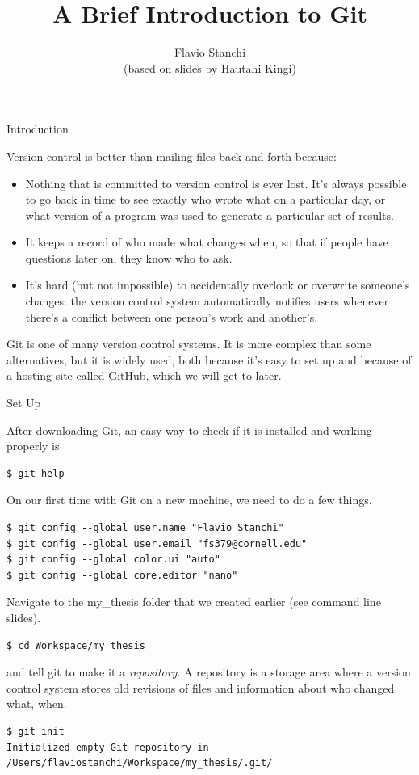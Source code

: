 \documentclass[10pt]{beamer}
\begin{document}
\title{A Brief Introduction to Git}
\author{Flavio Stanchi \\ (based on slides by Hautahi Kingi)}
\date{}


\maketitle

\begin{frame}{Introduction}


Version control is better than mailing files back and forth because:
\begin{itemize}
\item
Nothing that is committed to version control is ever lost. It's always possible to go back in time to see exactly who wrote what on a particular day, or what version of a program was used to generate a particular set of results.
\item
It keeps a record of who made what changes when, so that if people have questions later on, they know who to ask.
\item
It's hard (but not impossible) to accidentally overlook or overwrite someone's changes: the version control system automatically notifies users whenever there's a conflict between one person's work and another's.
\end{itemize}
Git is one of many version control systems. It is more complex than some alternatives, but it is widely used, both because it's easy to set up and because of a hosting site called GitHub, which we will get to later.

\end{frame}

\begin{frame}[fragile]{Set Up}

After downloading Git, an easy way to check if it is installed and working properly is
\begin{lstlisting}
$ git help
\end{lstlisting}
On our first time with Git on a new machine, we need to do a few things.
\begin{lstlisting}
$ git config --global user.name "Flavio Stanchi"
$ git config --global user.email "fs379@cornell.edu"
$ git config --global color.ui "auto"
$ git config --global core.editor "nano"
\end{lstlisting}
Navigate to the my\_thesis folder that we created earlier (see command line slides).
\begin{lstlisting}
$ cd Workspace/my_thesis
\end{lstlisting}
and tell git to make it a \emph{repository}. A repository is a storage area where a version control system stores old revisions of files and information about who changed what, when.
\begin{lstlisting}
$ git init
Initialized empty Git repository in /Users/flaviostanchi/Workspace/my_thesis/.git/
\end{lstlisting}

\end{frame}
\end{document}
